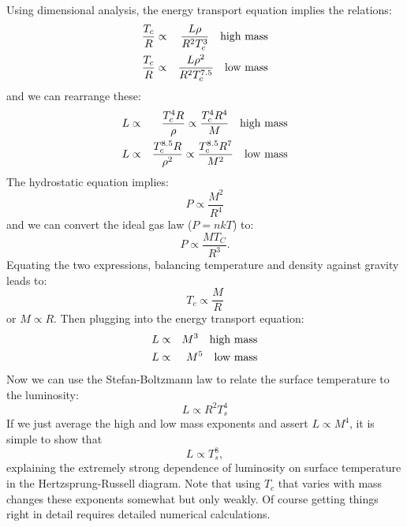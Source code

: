 \begin{enumerate}
\begin{answer}
Using dimensional analysis, the energy transport equation implies the
relations: 
\begin{eqnarray}
\frac{T_c}{R} &\propto& \frac{L \rho}{R^2T_c^3} \mathrm{\quad high~mass}\cr
\frac{T_c}{R} &\propto& \frac{L \rho^2}{R^2T_c^{7.5}} \mathrm{\quad low~mass}
\end{eqnarray}
and we can rearrange these:
\begin{eqnarray}
  L &\propto& \frac{T_c^4 R}{\rho} \propto \frac{T_c^4
  R^4}{M} \mathrm{\quad high~mass} \cr
  L &\propto& \frac{T_c^{8.5} R}{\rho^2} \propto \frac{T_c^{8.5}
  R^7}{M^2} \mathrm{\quad low~mass}
\end{eqnarray}
The hydrostatic equation implies:
\begin{equation}
P \propto \frac{M^2}{R^4}
\end{equation}
and we can convert the ideal gas law ($P = nkT$) to:
\begin{equation}
P \propto \frac{MT_C}{R^3}.
\end{equation}
Equating the two expressions, balancing temperature and density
against gravity leads to:
\begin{equation}
T_c \propto \frac{M}{R}
\end{equation}
or $M\propto R$. Then plugging into the energy transport equation:
\begin{eqnarray}
  L &\propto& M^3 \mathrm{\quad high~mass} \cr
  L &\propto& M^5 \mathrm{\quad low~mass}
\end{eqnarray}
Now we can use the Stefan-Boltzmann law to relate the surface
temperature to the luminosity:
\begin{equation}
L \propto R^2 T_s^4
\end{equation}
If we just average the high and low mass exponents and assert
$L\propto M^4$, it is simple to show that
\begin{equation}
L \propto T_s^8,
\end{equation}
explaining the extremely strong dependence of luminosity on surface
temperature in the Hertzsprung-Russell diagram. Note that using $T_c$
that varies with mass changes these exponents somewhat but only
weakly. Of course getting things right in detail requires detailed
numerical calculations.
\end{answer}
\end{enumerate} 

%


